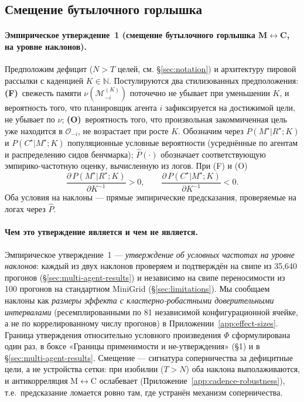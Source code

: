 \documentclass{article}
\begin{document}
\subsection{Смещение бутылочного горлышка}
\label{sec:shift}

\paragraph{Эмпирическое утверждение~1 (смещение бутылочного горлышка M$\leftrightarrow$C, на уровне наклонов).}
Предположим дефицит ($N > T$ целей, см. \S\ref{sec:notation}) и
архитектуру пировой рассылки с каденцией $K \in \mathbb{N}$. Постулируются два
стилизованных предположения:
\textbf{(F)}~свежесть памяти $\nu(\mathcal{M}_{-i}^{(K)})$
поточечно не убывает при уменьшении $K$, и вероятность того, что
планировщик агента $i$ зафиксируется на достижимой цели, не убывает по
$\nu$;
\textbf{(O)}~вероятность того, что произвольная закоммиченная цель
уже находится в $\mathcal{O}_{-i}$, не возрастает при росте $K$.
Обозначим через $P(M^\star|R^\star;K)$ и $P(C^\star|M^\star;K)$
популяционные условные вероятности (усреднённые по агентам и
распределению сидов бенчмарка); $\hat{P}(\cdot)$ обозначает
соответствующую эмпирико-частотную оценку, вычисленную из логов. При
(F) и (O)
\[
\frac{\partial\, P(M^\star|R^\star;K)}{\partial K^{-1}} > 0,
\qquad
\frac{\partial\, P(C^\star|M^\star;K)}{\partial K^{-1}} < 0.
\]
Оба условия на наклоны --- прямые эмпирические предсказания,
проверяемые на логах через $\hat{P}$.

\paragraph{Чем это утверждение является и чем не является.}
Эмпирическое утверждение~1 --- \emph{утверждение об условных частотах на уровне наклонов}: каждый из двух наклонов проверяем и подтверждён на свипе из 35{,}640 прогонов (\S\ref{sec:multi-agent-results}) и независимо на свипе переносимости из 100 прогонов на стандартном MiniGrid (\S\ref{sec:limitations}). Мы сообщаем наклоны как \emph{размеры эффекта с кластерно-робастными доверительными интервалами} (ресемплированными по 81 независимой конфигурационной ячейке, а не по коррелированному числу прогонов) в Приложении~\ref{app:effect-sizes}. Граница утверждения относительно условного произведения $\Phi$ сформулирована один раз, в боксе «Границы применимости и не-утверждения» (\S1) и в \S\ref{sec:multi-agent-results}. Смещение --- сигнатура соперничества за дефицитные цели, а не устройства сетки: при изобилии ($T{>}N$) оба наклона выполаживаются, и антикорреляция M$\leftrightarrow$C ослабевает (Приложение~\ref{app:cadence-robustness}), т.е.\ предсказание ломается ровно там, где устранён механизм соперничества.
\end{document}
